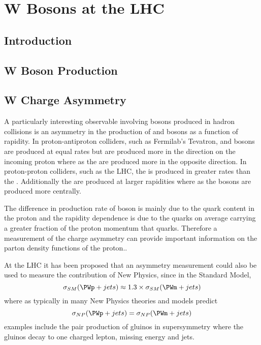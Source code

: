 
\chapter{W Bosons at the LHC}

\section{Introduction}
\section{W Boson Production}
\section{W Charge Asymmetry}

A particularly interesting observable involving \PW bosons produced in hadron
collisions is an asymmetry in the production of \PWp and \PWm bosons as a
function of rapidity.
In proton-antiproton colliders, such as Fermilab's Tevatron,  \PWp and \PWm
bosons are produced at equal rates but \PWp are produced more in the direction
on the incoming proton where as the \PWm are produced more in the opposite
direction.
In proton-proton colliders, such as the LHC, the \PWp is produced in greater
rates than the \PWm. Additionally the \PWp are produced at larger rapidities
where as the \PWm bosons are produced more centrally. \cite{phenom}

The difference in production rate of \PWpm boson is mainly due to the quark
content in the proton and the rapidity dependence is due to the \Pup quarks on
average carrying a greater fraction of the proton momentum that \Pdown quarks.
Therefore a measurement of the charge asymmetry can provide important
information on the parton density functions of the proton.\cite{phenom,pdf}.

At the LHC it has been proposed \cite{kom} that an asymmetry measurement could
also be used to measure the contribution of New Physics, since in the Standard
Model, \begin{equation}
\sigma_{SM}(\PWp + jets) \approx 1.3 \times \sigma_{SM}(\PWm + jets)
\end{equation}
where as typically in many New Physics theories and models predict
\begin{equation}
\sigma_{NP}(\PWp + jets) = \sigma_{NP}(\PWm + jets)
\end{equation}
examples include the pair production of gluinos in supersymmetry where the
gluinos decay to one charged lepton, missing energy and jets.\cite{kom}

